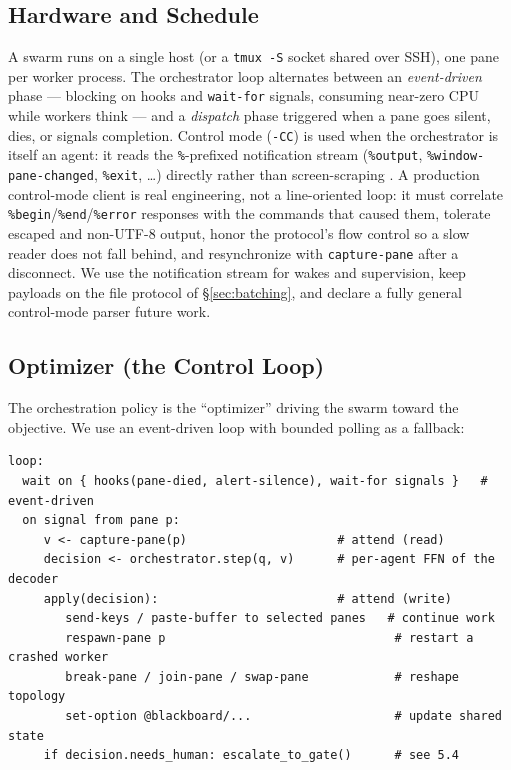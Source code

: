 \documentclass[10pt]{article}
\newcommand{\code}[1]{\texttt{\small #1}}
\begin{document}
\subsection{Hardware and Schedule}

A swarm runs on a single host (or a \code{tmux -S} socket shared over SSH), one pane
per worker process. The orchestrator loop alternates between an \emph{event-driven}
phase --- blocking on hooks and \code{wait-for} signals, consuming near-zero CPU while
workers think --- and a \emph{dispatch} phase triggered when a pane goes silent, dies,
or signals completion. Control mode (\code{-CC}) is used when the orchestrator is
itself an agent: it reads the \code{\%}-prefixed notification stream (\code{\%output},
\code{\%window-pane-changed}, \code{\%exit}, \dots) directly rather than
screen-scraping \cite{tmuxcontrol}. A production control-mode client is real
engineering, not a line-oriented loop: it must correlate
\code{\%begin}/\code{\%end}/\code{\%error} responses with the commands that caused
them, tolerate escaped and non-UTF-8 output, honor the protocol's flow control so a
slow reader does not fall behind, and resynchronize with \code{capture-pane} after
a disconnect. We use the notification stream for wakes and supervision, keep
payloads on the file protocol of \S\ref{sec:batching}, and declare a fully general
control-mode parser future work.

\subsection{Optimizer (the Control Loop)}

The orchestration policy is the ``optimizer'' driving the swarm toward the objective.
We use an event-driven loop with bounded polling as a fallback:

\begin{lstlisting}
loop:
  wait on { hooks(pane-died, alert-silence), wait-for signals }   # event-driven
  on signal from pane p:
     v <- capture-pane(p)                     # attend (read)
     decision <- orchestrator.step(q, v)      # per-agent FFN of the decoder
     apply(decision):                         # attend (write)
        send-keys / paste-buffer to selected panes   # continue work
        respawn-pane p                                # restart a crashed worker
        break-pane / join-pane / swap-pane            # reshape topology
        set-option @blackboard/...                    # update shared state
     if decision.needs_human: escalate_to_gate()      # see 5.4
\end{lstlisting}
\end{document}
